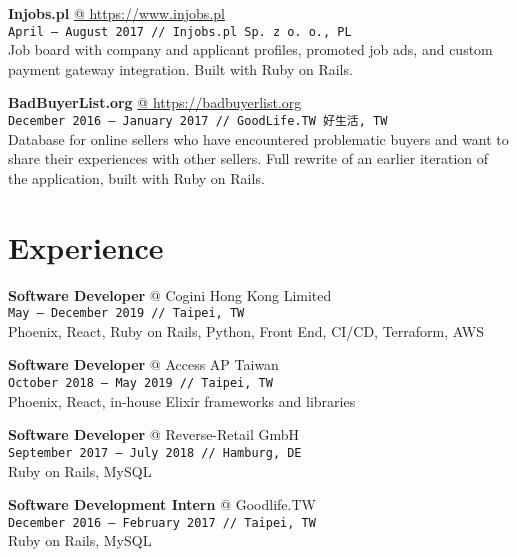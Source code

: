 \documentclass[10pt,a4paper]{article}
\makeatletter
\newcommand{\projectweb}[4]{\par\vspace{1em}\textbf{\normalsize #1} \href{#2}{\color{darkgray} @ #2}\\{\footnotesize\texttt{#3 // #4}}\\[4pt]}
\newcommand{\experience}[4]{\par\vspace{1em}\textbf{\normalsize #1} {\color{darkgray} @ #2}\\{\footnotesize\texttt{#3 // #4}}\\[4pt]}
\makeatother
\begin{document}
\begin{minipage}[t]{0.67\textwidth}
  \projectweb{Injobs.pl}{https://www.injobs.pl}{April {–} August 2017}{Injobs.pl Sp. z o. o., PL}

  \small
  Job board with company and applicant profiles, promoted job ads, and custom payment gateway integration. Built with Ruby on Rails.

  \projectweb{BadBuyerList.org}{https://badbuyerlist.org}{December 2016 {–} January 2017}{GoodLife.TW 好生活, TW}

  \small
  Database for online sellers who have encountered problematic buyers and want to share their experiences with other sellers. Full rewrite of an earlier iteration of the application, built with Ruby on Rails.

  \vspace{1.2em}
  \section{Experience}
  \vspace*{-6pt}

  \experience{Software Developer}{Cogini Hong Kong Limited}{May {–} December 2019}{Taipei, TW}

  \small Phoenix, React, Ruby on Rails, Python, Front End, CI/CD, Terraform, AWS

  \experience{Software Developer}{Access AP Taiwan}{October 2018 {–} May 2019}{Taipei, TW}

  \small Phoenix, React, in-house Elixir frameworks and libraries

  \experience{Software Developer}{Reverse-Retail GmbH}{September 2017 {–} July 2018}{Hamburg, DE}

  \small Ruby on Rails, MySQL

  \experience{Software Development Intern}{Goodlife.TW}{December 2016 {–} February 2017}{Taipei, TW}

  \small Ruby on Rails, MySQL

\end{minipage}\hspace{0.03\textwidth}%
\end{document}

